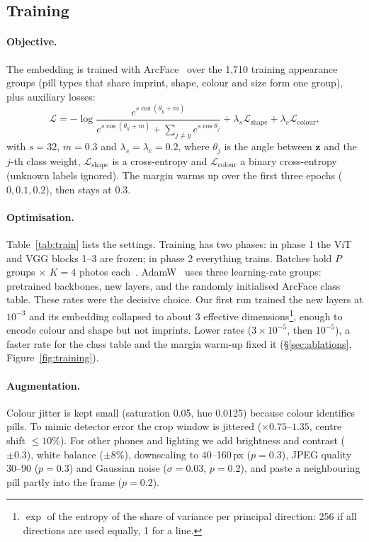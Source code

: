 \subsection{Training}
\label{sec:training}

\paragraph{Objective.} The embedding is trained with ArcFace~\citep{deng2019arcface} over the 1,710 training
appearance groups (pill types that share imprint, shape, colour and size form one group), plus auxiliary losses:
\begin{equation}
  \mathcal{L}=-\log\frac{e^{s\cos(\theta_y+m)}}{e^{s\cos(\theta_y+m)}+\sum_{j\neq y}e^{s\cos\theta_j}}
  +\lambda_s\mathcal{L}_{\text{shape}}+\lambda_c\mathcal{L}_{\text{colour}},
  \label{eq:loss}
\end{equation}
with $s=32$, $m=0.3$ and $\lambda_s=\lambda_c=0.2$, where $\theta_j$ is the angle between $\mathbf{z}$ and the $j$-th
class weight, $\mathcal{L}_{\text{shape}}$ is a cross-entropy and $\mathcal{L}_{\text{colour}}$ a binary cross-entropy
(unknown labels ignored). The margin warms up over the first three epochs ($0, 0.1, 0.2$), then stays at $0.3$.

\paragraph{Optimisation.} Table~\ref{tab:train} lists the settings. Training has two phases: in phase 1 the ViT and VGG
blocks 1--3 are frozen; in phase 2 everything trains. Batches hold $P$ groups $\times$ $K{=}4$ photos
each~\citep{hermans2017triplet}. AdamW~\citep{loshchilov2019adamw} uses three learning-rate groups: pretrained
backbones, new layers, and the randomly initialised ArcFace class table. These rates were the decisive choice. Our
first run trained the new layers at $10^{-3}$ and its embedding collapsed to about 3 effective
dimensions\footnote{$\exp$ of the entropy of the share of variance per principal direction: 256 if all directions are
used equally, 1 for a line.}, enough to encode colour and shape but not imprints. Lower rates ($3\times10^{-5}$, then
$10^{-5}$), a faster rate for the class table and the margin warm-up fixed it (\S\ref{sec:ablations},
Figure~\ref{fig:training}).

\paragraph{Augmentation.} Colour jitter is kept small (saturation 0.05, hue 0.0125) because colour identifies pills.
To mimic detector error the crop window is jittered ($\times0.75$--$1.35$, centre shift $\le 10\%$). For other phones
and lighting we add brightness and contrast ($\pm0.3$), white balance ($\pm8\%$), downscaling to 40--160\,px
($p{=}0.3$), JPEG quality 30--90 ($p{=}0.3$) and Gaussian noise ($\sigma{=}0.03$, $p{=}0.2$), and paste a
neighbouring pill partly into the frame ($p{=}0.2$).

